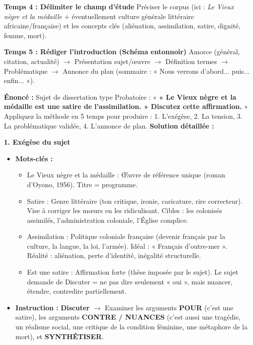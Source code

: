 \documentclass[11pt]{article}
\newcommand{\cle}[1]{{\popxbold\color{popdark}#1}}
\begin{document}
\begin{methode}
\textbf{Temps 4 : Délimiter le champ d'étude}
Préciser le corpus (ici : \emph{Le Vieux nègre et la médaille} + éventuellement culture générale littéraire africaine/française) et les concepts clés (aliénation, assimilation, satire, dignité, femme, mort).

\textbf{Temps 5 : Rédiger l'introduction (Schéma entonnoir)}
\cle{Amorce} (général, citation, actualité) $\to$ \cle{Présentation sujet/œuvre} $\to$ \cle{Définition termes} $\to$ \cle{Problématique} $\to$ \cle{Annonce du plan} (sommaire : « Nous verrons d'abord... puis... enfin... »).
\end{methode}

\begin{exoresolu}
\textbf{Énoncé :} Sujet de dissertation type Probatoire : 
« \textbf{« Le Vieux nègre et la médaille est une satire de l'assimilation. » Discutez cette affirmation.} »
Appliquez la méthode en 5 temps pour produire : 1. L'exégèse, 2. La tension, 3. La problématique validée, 4. L'annonce de plan.
\tcblower
\textbf{Solution détaillée :}

\textbf{1. Exégèse du sujet}
\begin{itemize}
    \item \textbf{Mots-clés :}
    \begin{itemize}
        \item \cle{Le Vieux nègre et la médaille} : Œuvre de référence unique (roman d'Oyono, 1956). Titre = programme.
        \item \cle{Satire} : Genre littéraire (ton critique, ironie, caricature, rire correcteur). Vise à corriger les mœurs en les ridiculisant. Cibles : les colonisés assimilés, l'administration coloniale, l'Église complice.
        \item \cle{Assimilation} : Politique coloniale française (devenir français par la culture, la langue, la loi, l'armée). Idéal : « Français d'outre-mer ». Réalité : aliénation, perte d'identité, inégalité structurelle.
        \item \cle{Est une satire} : Affirmation forte (thèse imposée par le sujet). Le sujet demande de \cle{Discuter} = ne pas dire seulement « oui », mais nuancer, étendre, contredire partiellement.
    \end{itemize}
    \item \textbf{Instruction :} \textbf{Discuter} $\to$ Examiner les arguments \textbf{POUR} (c'est une satire), les arguments \textbf{CONTRE / NUANCES} (c'est aussi une tragédie, un réalisme social, une critique de la condition féminine, une métaphore de la mort), et \textbf{SYNTHÉTISER}.
\end{itemize}


\end{exoresolu}
\end{document}
